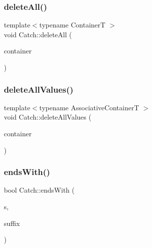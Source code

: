 \subsubsection{\texorpdfstring{delete\+All()}{deleteAll()}}
{\footnotesize\ttfamily template$<$typename ContainerT $>$ \\
void Catch\+::delete\+All (\begin{DoxyParamCaption}\item[{ContainerT \&}]{container }\end{DoxyParamCaption})\hspace{0.3cm}{\ttfamily [inline]}}

\mbox{\label{namespace_catch_af2fcec1d4bd984fe19ff8b9a432c36a8}} 
\subsubsection{\texorpdfstring{delete\+All\+Values()}{deleteAllValues()}}
{\footnotesize\ttfamily template$<$typename Associative\+ContainerT $>$ \\
void Catch\+::delete\+All\+Values (\begin{DoxyParamCaption}\item[{Associative\+ContainerT \&}]{container }\end{DoxyParamCaption})\hspace{0.3cm}{\ttfamily [inline]}}

\mbox{\label{namespace_catch_ada025504f627feaf9ac68ca391515dff}} 
\subsubsection{\texorpdfstring{ends\+With()}{endsWith()}\hspace{0.1cm}{\footnotesize\ttfamily [1/2]}}
{\footnotesize\ttfamily bool Catch\+::ends\+With (\begin{DoxyParamCaption}\item[{\textbf{ std\+::string} const \&}]{s,  }\item[{\textbf{ std\+::string} const \&}]{suffix }\end{DoxyParamCaption})}

\mbox{\label{namespace_catch_afd801a3e33fd7a8b91ded0d02747a93f}} 
